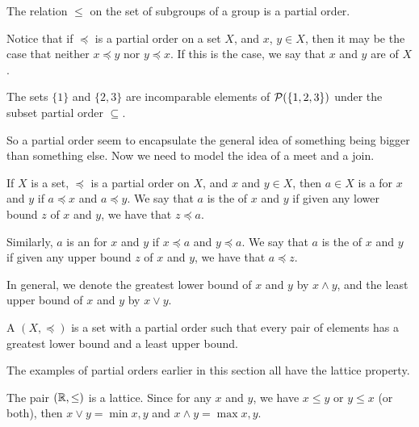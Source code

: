 \begin{example}
  The relation $\le$ on the set of subgroups of a group is a partial order.
\end{example}

Notice that if $\preceq$ is a partial order on a
set $X$, and $x$, $y \in X$, then it may be the case that neither $x \preceq y$
nor $y \preceq x$.  If this is the case, we say that $x$ and $y$ are
 of $X$.

\begin{example}
  The sets $\{1\}$ and $\{2,3\}$ are incomparable elements of
  $\mathcal{P}(\{1,2,3\})$ under the subset partial order $\subseteq$.
\end{example}

So a partial order seem to encapsulate the general idea of something being
bigger than something else.  Now we need to model the idea of a meet and a
join.

\begin{definition}
  If $X$ is a set, $\preceq$ is a partial order on $X$, and $x$ and $y \in X$,
  then $a \in X$ is a  for $x$ and $y$ if $a \preceq x$ and
  $a \preceq y$.  We say that $a$ is the  of $x$ and $y$ if given any lower bound
  $z$ of $x$ and $y$, we have that $z \preceq a$.
  
  Similarly, $a$ is an  for $x$ and $y$ if
  $x \preceq a$ and $y \preceq a$.  We say that $a$ is the  of $x$ and $y$ if given any upper bound
  $z$ of $x$ and $y$, we have that $a \preceq z$.
  
  In general, we denote the greatest lower bound of $x$ and $y$ by $x \wedge y$,
  and the least upper bound of $x$ and $y$ by $x \vee y$.
  
  A  $(X, \preceq)$ is a set with a partial order such that
  every pair of elements has a greatest lower bound and a least upper bound.
\end{definition}

The examples of partial orders earlier in this section all have the lattice
property.

\begin{example}
  The pair $(\mathbb{R}, \le)$ is a lattice.  Since for any $x$ and $y$, we have
  $x \le y$ or $y \le x$ (or both), then $x \vee y = \min x,y$ and 
  $x \wedge y = \max x,y$.
\end{example}

